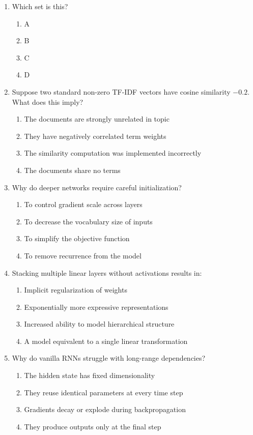\documentclass[12pt]{article}
\begin{document}
 \begin{enumerate}[label=Q\arabic*.]
 
 \item Which set is this?
 \begin{enumerate}[label=(\Alph*)]
     \item A
     \item B
     \item C
     \item D
 \end{enumerate}
 
 \item Suppose two standard non-zero TF-IDF vectors have cosine similarity $-0.2$. What does this imply?
 \begin{enumerate}[label=(\Alph*)]
     \item The documents are strongly unrelated in topic
     \item They have negatively correlated term weights
     \item The similarity computation was implemented incorrectly
     \item The documents share no terms
 \end{enumerate}
 
 \item Why do deeper networks require careful initialization?
 \begin{enumerate}[label=(\Alph*)]
     \item To control gradient scale across layers
     \item To decrease the vocabulary size of inputs
     \item To simplify the objective function
     \item To remove recurrence from the model
 \end{enumerate}
 
 \item Stacking multiple linear layers without activations results in:
 \begin{enumerate}[label=(\Alph*)]
     \item Implicit regularization of weights
     \item Exponentially more expressive representations
     \item Increased ability to model hierarchical structure
     \item A model equivalent to a single linear transformation
 \end{enumerate}
 
 \item Why do vanilla RNNs struggle with long-range dependencies?
 \begin{enumerate}[label=(\Alph*)]
     \item The hidden state has fixed dimensionality
     \item They reuse identical parameters at every time step
     \item Gradients decay or explode during backpropagation
     \item They produce outputs only at the final step
 \end{enumerate}
 

\end{enumerate}
\end{document}
